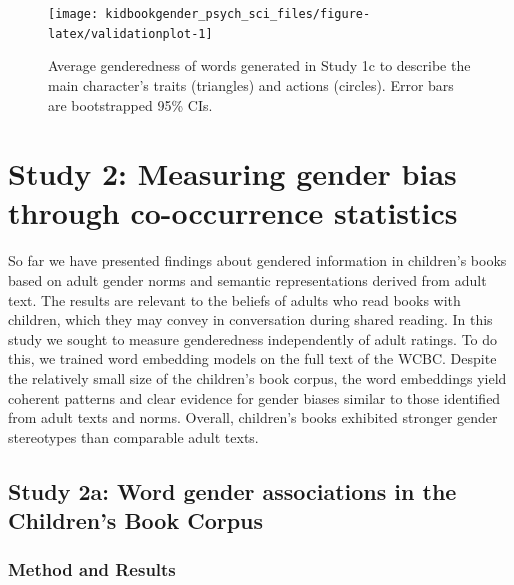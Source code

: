 \documentclass[
  english,
  ,man,floatsintext]{apa6}
\begin{document}
\begin{figure}[t]
\texttt{[image: kidbookgender\_psych\_sci\_files/figure-latex/validationplot-1]} \caption{Average genderedness of words generated in Study 1c to describe the main character's traits (triangles) and actions (circles). Error bars are bootstrapped 95\% CIs.}\label{fig:validationplot}
\end{figure}

\hypertarget{study-2-measuring-gender-bias-through-co-occurrence-statistics}{%
\section{Study 2: Measuring gender bias through co-occurrence statistics}\label{study-2-measuring-gender-bias-through-co-occurrence-statistics}}

So far we have presented findings about gendered information in children's books based on adult gender norms and semantic representations derived from adult text. The results are relevant to the beliefs of adults who read books with children, which they may convey in conversation during shared reading. In this study we sought to measure genderedness independently of adult ratings. To do this, we trained word embedding models on the full text of the WCBC. Despite the relatively small size of the children's book corpus, the word embeddings yield coherent patterns and clear evidence for gender biases similar to those identified from adult texts and norms. Overall, children's books exhibited stronger gender stereotypes than comparable adult texts.

\hypertarget{study-2a-word-gender-associations-in-the-childrens-book-corpus}{%
\subsection{Study 2a: Word gender associations in the Children's Book Corpus}\label{study-2a-word-gender-associations-in-the-childrens-book-corpus}}

\hypertarget{method-and-results-1}{%
\subsubsection{Method and Results}\label{method-and-results-1}}
\end{document}
